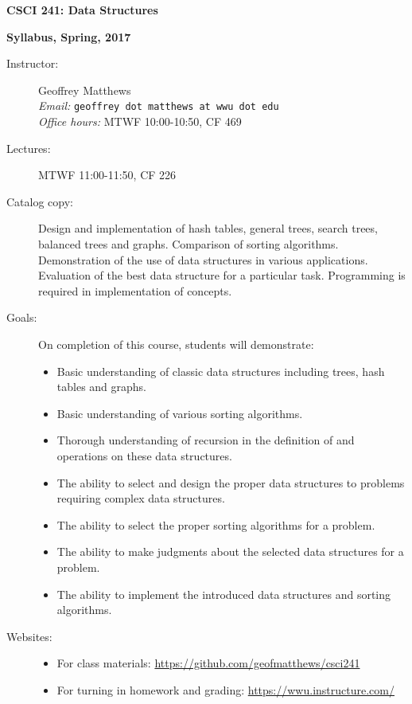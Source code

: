 \documentclass{article}
\begin{document}
\centerline{\Large\bf CSCI 241: Data Structures}
\centerline{\large\bf Syllabus, Spring, 2017}


\begin{description}


\item[Instructor:] Geoffrey Matthews\\
{\em Email:} {\tt geoffrey dot matthews at wwu dot edu}\\
{\em Office hours:} MTWF 10:00-10:50, CF 469


\item[Lectures:] MTWF 11:00-11:50, CF 226


\item[Catalog copy:] Design and implementation of hash tables, general
  trees, search trees, balanced trees and graphs. Comparison of
  sorting algorithms. Demonstration of the use of data structures in
  various applications. Evaluation of the best data structure for a
  particular task. Programming is required in implementation of
  concepts.

\item[Goals:]  On completion of this course, students will demonstrate:
\begin{itemize}
\item
  Basic understanding of classic data structures including trees, hash
  tables and graphs. 
\item Basic understanding of various sorting algorithms.
\item Thorough understanding of recursion in the definition of and
  operations on these data structures. 
\item The ability to select and design the proper data structures to
  problems requiring complex data structures. 
\item The ability to select the proper sorting algorithms for a
  problem. 
\item The ability to make judgments about the selected data structures
  for a problem. 
\item The ability to implement the introduced data structures and
  sorting algorithms. 

\end{itemize}

\item[Websites:]\mbox{}
\begin{itemize}
  \item For class materials:
    \url{https://github.com/geofmatthews/csci241} 
  \item For turning in homework and grading:
    \url{https://wwu.instructure.com/}  
\end{itemize}


\end{description}
\end{document}
